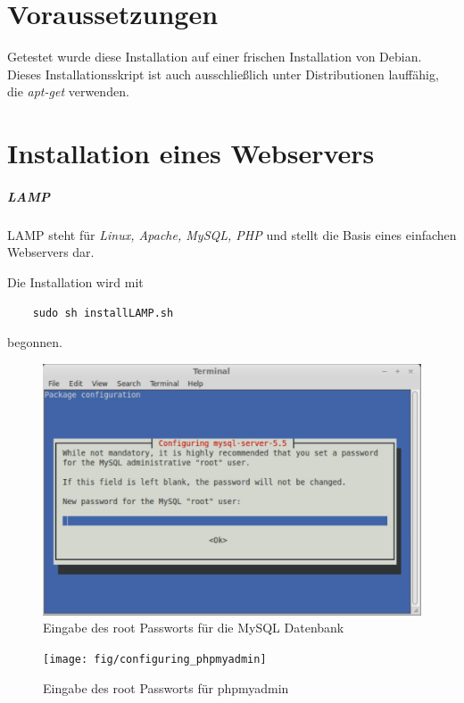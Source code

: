 \chapter{Voraussetzungen}
Getestet wurde diese Installation auf einer frischen Installation von Debian. Dieses Installationsskript ist auch ausschließlich unter Distributionen lauffähig, die \emph{apt-get} verwenden.

\chapter{Installation eines Webservers}
\paragraph{LAMP}
LAMP steht für \emph{Linux, Apache, MySQL, PHP} und stellt die Basis eines einfachen Webservers dar.\par

Die Installation wird mit 

\begin{lstlisting}
	sudo sh installLAMP.sh
\end{lstlisting}

begonnen.

\begin{figure}[!ht]
	\centering
	\includegraphics[width=15cm]{fig/configuring_mysql}
	\caption{Eingabe des root Passworts für die MySQL Datenbank}
\end{figure}

\begin{figure}[!ht]
	\centering
	\texttt{[image: fig/configuring\_phpmyadmin]}
	\caption{Eingabe des root Passworts für phpmyadmin}
\end{figure}

